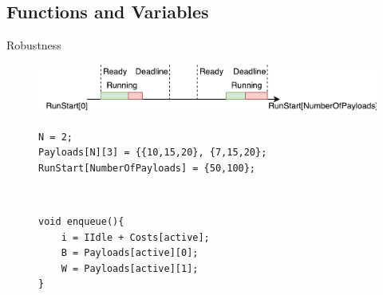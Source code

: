\subsection{Functions and Variables}
\begin{frame}[fragile]{Robustness}{\insertsubsection}
	\centering
	\begin{figure}[h]
		\includegraphics[width=1\textwidth]{graphics/payload_execution}
	\end{figure}
	\begin{figure}[h]
		\begin{minipage}{.7\textwidth}
		\begin{lstlisting}
N = 2;
Payloads[N][3] = {{10,15,20}, {7,15,20};
RunStart[NumberOfPayloads] = {50,100};
		\end{lstlisting}
		\end{minipage}\\
		\begin{minipage}{.7\textwidth}
			\begin{lstlisting}
void enqueue(){
	i = IIdle + Costs[active];
	B = Payloads[active][0];
	W = Payloads[active][1];
}
			\end{lstlisting}
		\end{minipage}
	\end{figure}
\end{frame}

